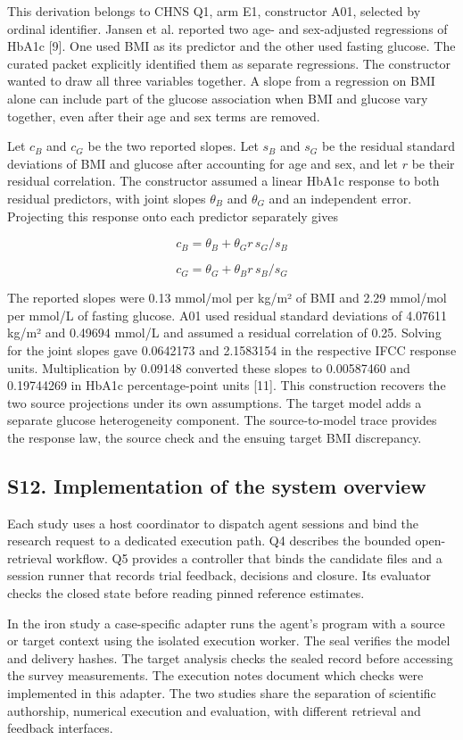\documentclass[11pt,letterpaper]{article}
\begin{document}
This derivation belongs to CHNS Q1, arm E1, constructor A01, selected by ordinal identifier. Jansen et al. reported two age- and sex-adjusted regressions of HbA1c [9]. One used BMI as its predictor and the other used fasting glucose. The curated packet explicitly identified them as separate regressions. The constructor wanted to draw all three variables together. A slope from a regression on BMI alone can include part of the glucose association when BMI and glucose vary together, even after their age and sex terms are removed.


Let \(c_B\) and \(c_G\) be the two reported slopes. Let \(s_B\) and \(s_G\) be the residual standard deviations of BMI and glucose after accounting for age and sex, and let \(r\) be their residual correlation. The constructor assumed a linear HbA1c response to both residual predictors, with joint slopes \(\theta_B\) and \(\theta_G\) and an independent error. Projecting this response onto each predictor separately gives


\[
c_B = \theta_B + \theta_G r\,s_G/s_B
\]

\[
c_G = \theta_G + \theta_B r\,s_B/s_G
\]

The reported slopes were 0.13 mmol/\allowbreak{}mol per kg/\allowbreak{}m² of BMI and 2.29 mmol/\allowbreak{}mol per mmol/\allowbreak{}L of fasting glucose. A01 used residual standard deviations of 4.07611 kg/\allowbreak{}m² and 0.49694 mmol/\allowbreak{}L and assumed a residual correlation of 0.25. Solving for the joint slopes gave 0.0642173 and 2.1583154 in the respective IFCC response units. Multiplication by 0.09148 converted these slopes to 0.00587460 and 0.19744269 in HbA1c percentage-point units [11]. This construction recovers the two source projections under its own assumptions. The target model adds a separate glucose heterogeneity component. The source-to-model trace provides the response law, the source check and the ensuing target BMI discrepancy.


\subsection*{S12. Implementation of the system overview}

Each study uses a host coordinator to dispatch agent sessions and bind the research request to a dedicated execution path. Q4 describes the bounded open-retrieval workflow. Q5 provides a controller that binds the candidate files and a session runner that records trial feedback, decisions and closure. Its evaluator checks the closed state before reading pinned reference estimates.


In the iron study a case-specific adapter runs the agent's program with a source or target context using the isolated execution worker. The seal verifies the model and delivery hashes. The target analysis checks the sealed record before accessing the survey measurements. The execution notes document which checks were implemented in this adapter. The two studies share the separation of scientific authorship, numerical execution and evaluation, with different retrieval and feedback interfaces.
\end{document}
